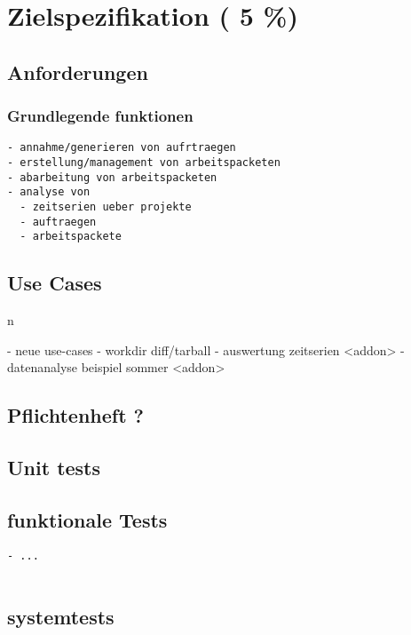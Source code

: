 \chapter{Zielspezifikation ( 5 \%)}

\section{Anforderungen}

\subsection{Grundlegende funktionen}

\begin{verbatim}
- annahme/generieren von aufrtraegen
- erstellung/management von arbeitspacketen
- abarbeitung von arbeitspacketen
- analyse von
  - zeitserien ueber projekte
  - auftraegen
  - arbeitspackete
\end{verbatim}

\section{Use Cases}n

- neue use-cases
  - workdir diff/tarball
  - auswertung zeitserien <addon>
  - datenanalyse beispiel sommer <addon>

\section{Pflichtenheft ?}
\section{Unit tests}
\section{funktionale Tests}

\begin{verbatim}
- ...


\end{verbatim}

\section{systemtests}

